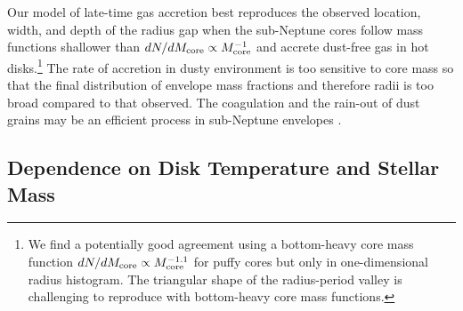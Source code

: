 \documentclass[twocolumn]{aastex63}
\begin{document}
Our model of late-time gas accretion best reproduces the observed location, width, and depth of the radius gap when the sub-Neptune cores follow mass functions shallower than $dN/dM_{\rm core} \propto M_{\rm core}^{-1}$ and accrete dust-free gas in hot disks.\footnote{We find a potentially good agreement using a bottom-heavy core mass function $dN/dM_{\rm core} \propto M_{\rm core}^{-1.1}$ for puffy cores but only in one-dimensional radius histogram. The triangular shape of the radius-period valley is challenging to reproduce with bottom-heavy core mass functions.} The rate of accretion in dusty environment is too sensitive to core mass so that the final distribution of envelope mass fractions and therefore radii is too broad compared to that observed. The coagulation and the rain-out of dust grains may be an efficient process in sub-Neptune envelopes \citep{Ormel14}.

\subsection{Dependence on Disk Temperature and Stellar Mass}
\label{ssec:Tdisk}
\end{document}
